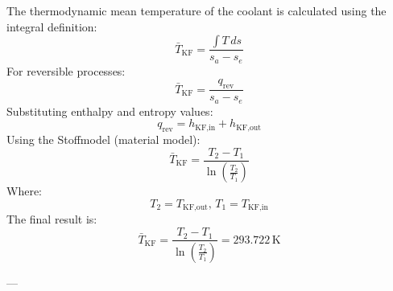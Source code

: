 The thermodynamic mean temperature of the coolant is calculated using the integral definition:  
\[
\bar{T}_{\text{KF}} = \frac{\int T \, ds}{s_a - s_e}
\]  
For reversible processes:  
\[
\bar{T}_{\text{KF}} = \frac{q_{\text{rev}}}{s_a - s_e}
\]  
Substituting enthalpy and entropy values:  
\[
q_{\text{rev}} = h_{\text{KF,in}} + h_{\text{KF,out}}
\]  
Using the Stoffmodel (material model):  
\[
\bar{T}_{\text{KF}} = \frac{T_2 - T_1}{\ln \left( \frac{T_2}{T_1} \right)}
\]  
Where:  
\[
T_2 = T_{\text{KF,out}}, \, T_1 = T_{\text{KF,in}}
\]  
The final result is:  
\[
\bar{T}_{\text{KF}} = \frac{T_2 - T_1}{\ln \left( \frac{T_2}{T_1} \right)} = 293.722 \, \text{K}
\]  

---